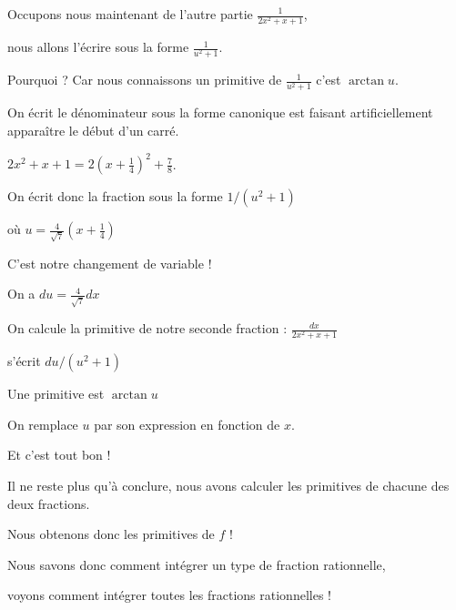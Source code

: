 Occupons nous maintenant de l'autre partie $\frac{1}{2x^2+x+1}$, 

\change

nous allons l'écrire sous la forme
$\frac{1}{u^2+1}$.

\change

Pourquoi ? Car nous connaissons un primitive de 
$\frac{1}{u^2+1}$ c'est $\arctan u$.

\change

On écrit le dénominateur sous la forme canonique est faisant
artificiellement apparaître le début d'un carré.

\change

$2x^2+x+1 = 2(x+\frac 14)^2+\frac78$.

\change

On écrit donc la fraction sous la forme $1/(u^2+1)$

\change 

où $u = \frac{4}{\sqrt7}(x+\frac 14)$

\change

C'est notre changement de variable !

\change

On a $du = \frac{4}{\sqrt7} dx$

\change

On calcule la primitive de notre seconde fraction :
$\frac{dx}{2x^2+x+1} $

\change

\change

s'écrit $du/(u^2+1)$

\change

Une primitive est $\arctan u$

\change 

On remplace $u$ par son expression en fonction de $x$.

Et c'est tout bon !


\change

Il ne reste plus qu'à conclure,
nous avons calculer les primitives de chacune des deux fractions.

\change

\change

Nous obtenons donc les primitives de $f$ !



\diapo

Nous savons donc comment intégrer un type de fraction rationnelle,

voyons comment intégrer toutes les fractions rationnelles !


